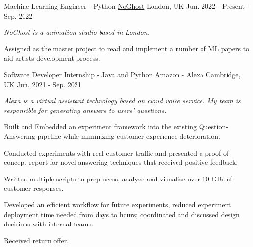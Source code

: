 

\begin{cventries}
  \cventry
  {Machine Learning Engineer - Python} %
  {\href{https://www.noghost.co.uk/}{NoGhost}} %
  {London, UK} %
  {Jun. 2022 - Present - Sep. 2022} %
  {
    \begin{cvitems} %
      \item {\textit{NoGhost is a animation studio based in London.}}
      \item {Assigned as the master project to read and implement a number of ML papers to aid artists development process.}
    \end{cvitems}
  }

  \cventry
    {Software Developer Internship - Java and Python} %
    {Amazon - Alexa} %
    {Cambridge, UK} %
    {Jun. 2021 - Sep. 2021} %
    {
      \begin{cvitems} %
        \item {\textit{Alexa is a virtual assistant technology based on cloud voice service. My team is responsible for generating answers to users' questions.}}
        \item {Built and Embedded an experiment framework into the existing Question-Answering pipeline while minimizing customer experience deterioration.}
        \item {Conducted experiments with real customer traffic and presented a proof-of-concept report for novel answering techniques that received positive feedback.}
        \item {Written multiple scripts to preprocess, analyze and visualize over 10 GBs of customer responses.}
        \item {Developed an efficient workflow for future experiments, reduced experiment deployment time needed from days to hours; coordinated and discussed design decisions with internal teams.}
        \item {Received return offer.}
      \end{cvitems}
    }


\end{cventries}
